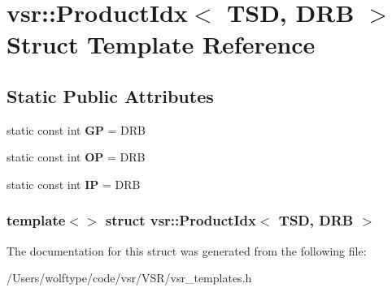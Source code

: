 \hypertarget{structvsr_1_1_product_idx_3_01_t_s_d_00_01_d_r_b_01_4}{\section{vsr\-:\-:Product\-Idx$<$ T\-S\-D, D\-R\-B $>$ Struct Template Reference}
\label{structvsr_1_1_product_idx_3_01_t_s_d_00_01_d_r_b_01_4}
}
\subsection*{Static Public Attributes}
\begin{DoxyCompactItemize}
\item 
\hypertarget{structvsr_1_1_product_idx_3_01_t_s_d_00_01_d_r_b_01_4_a87a890e194cc49ff3bc153a599c6ac26}{static const int {\bfseries G\-P} = D\-R\-B}\label{structvsr_1_1_product_idx_3_01_t_s_d_00_01_d_r_b_01_4_a87a890e194cc49ff3bc153a599c6ac26}

\item 
\hypertarget{structvsr_1_1_product_idx_3_01_t_s_d_00_01_d_r_b_01_4_aea132e2b2202d75b1b62a05f18789c5f}{static const int {\bfseries O\-P} = D\-R\-B}\label{structvsr_1_1_product_idx_3_01_t_s_d_00_01_d_r_b_01_4_aea132e2b2202d75b1b62a05f18789c5f}

\item 
\hypertarget{structvsr_1_1_product_idx_3_01_t_s_d_00_01_d_r_b_01_4_a920d41490a3e19bff6bb2264837cc6b8}{static const int {\bfseries I\-P} = D\-R\-B}\label{structvsr_1_1_product_idx_3_01_t_s_d_00_01_d_r_b_01_4_a920d41490a3e19bff6bb2264837cc6b8}

\end{DoxyCompactItemize}
\subsubsection*{template$<$$>$ struct vsr\-::\-Product\-Idx$<$ T\-S\-D, D\-R\-B $>$}



The documentation for this struct was generated from the following file\-:\begin{DoxyCompactItemize}
\item 
/\-Users/wolftype/code/vsr/\-V\-S\-R/vsr\-\_\-templates.\-h\end{DoxyCompactItemize}
